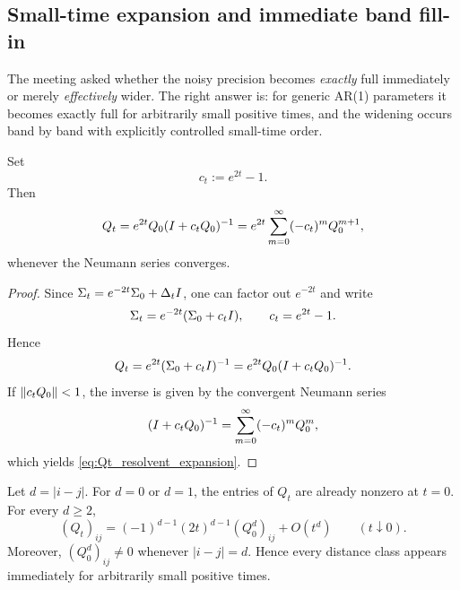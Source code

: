 \documentclass[11pt]{article}
\begin{document}
\subsection{Small-time expansion and immediate band fill-in}

The meeting asked whether the noisy precision becomes \emph{exactly} full immediately or merely \emph{effectively} wider. The right answer is: for generic AR(1) parameters it becomes exactly full for arbitrarily small positive times, and the widening occurs band by band with explicitly controlled small-time order.

\begin{proposition}[Resolvent expansion around $t=0$]\label{prop:resolvent_expansion}
Set
\begin{equation}
 c_t:=e^{2t}-1.
\end{equation}
Then
\begin{equation}\label{eq:Qt_resolvent_expansion}
Q_t=e^{2t}Q_0(I+c_tQ_0)^{-1}
=e^{2t}\sum_{m=0}^{\infty}(-c_t)^m Q_0^{m+1},
\end{equation}
whenever the Neumann series converges.
\end{proposition}

\begin{proof}
Since $\Sigma_t=e^{-2t}\Sigma_0+\Delta_tI$, one can factor out $e^{-2t}$ and write
\begin{equation}
 \Sigma_t=e^{-2t}(\Sigma_0+c_tI),
 \qquad c_t=e^{2t}-1.
\end{equation}
Hence
\begin{equation}
Q_t=e^{2t}(\Sigma_0+c_tI)^{-1}
=e^{2t}Q_0(I+c_tQ_0)^{-1}.
\end{equation}
If $\lVert c_tQ_0\rVert<1$, the inverse is given by the convergent Neumann series
\begin{equation}
 (I+c_tQ_0)^{-1}=\sum_{m=0}^{\infty}(-c_t)^mQ_0^m,
\end{equation}
which yields \eqref{eq:Qt_resolvent_expansion}.
\end{proof}

\begin{theorem}\label{thm:distance_d_order}
Let $d=|i-j|$. For $d=0$ or $d=1$, the entries of $Q_t$ are already nonzero at $t=0$. For every $d\geq 2$,
\begin{equation}\label{eq:distance_d_asymptotic}
 (Q_t)_{ij}=(-1)^{d-1}(2t)^{d-1}(Q_0^d)_{ij}+O(t^d)
 \qquad (t\downarrow 0).
\end{equation}
Moreover, $(Q_0^d)_{ij}\neq 0$ whenever $|i-j|=d$. Hence every distance class appears immediately for arbitrarily small positive times.
\end{theorem}
\end{document}
